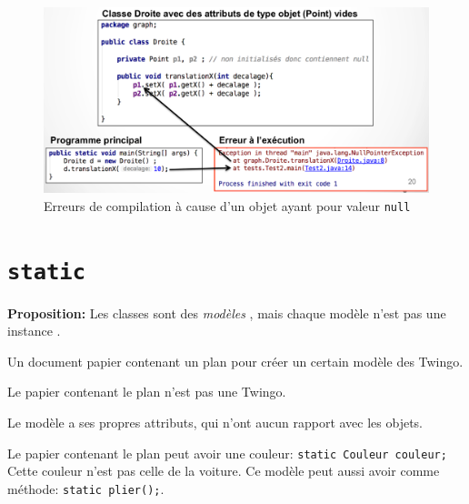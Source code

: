			
			\begin{figure}[h]
				\centering
				\includegraphics[width=1.0\linewidth]{images/pointeurnull}
				\caption{Erreurs de compilation à cause d'un objet ayant pour valeur \lstinline|null|}
				\label{fig:pointeurnull}
			\end{figure}
		
	\section{\lstinline|static|}
	
		\textbf{Proposition:}
		Les classes sont des \emph{modèles} , mais chaque modèle n'est pas une instance .
		\begin{exemple}[Modèle]
			\label{classesmodeles}Un document papier contenant un plan pour créer un certain modèle des \og Twingo\fg{}.
		\end{exemple}
	
	\begin{exemple}[Instance]
		\label{modelesinstances}Le papier contenant le plan n'est pas une \og Twingo\fg{}.
	\end{exemple}

	Le modèle a ses propres attributs, qui n'ont aucun rapport avec les objets.
	
	\begin{exemple}
		Le papier contenant le plan peut avoir une couleur: \lstinline|static Couleur couleur;|
		Cette couleur n'est pas celle de la voiture.
		Ce modèle peut aussi avoir comme méthode: \lstinline|static plier();|.
	\end{exemple}

